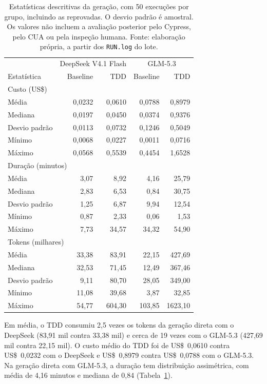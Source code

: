 \documentclass[a4paper,12pt,twoside,english,brazilian]{book}
\begin{document}
\begin{table}[htp]
  \centering
  \caption{Estatísticas descritivas da geração, com 50 execuções por grupo,
    incluindo as reprovadas. O desvio padrão é amostral. Os valores não incluem
    a avaliação posterior pelo Cypress, pelo CUA ou pela inspeção humana.
    Fonte: elaboração própria, a partir dos \texttt{RUN.log} do lote.}
  \label{tab:formulario-recursos}
  \begin{tabular}{lrrrr}
    \hline
    & \multicolumn{2}{c}{DeepSeek V4.1 Flash} & \multicolumn{2}{c}{GLM-5.3} \\
    Estatística & Baseline & TDD & Baseline & TDD \\
    \hline
    \multicolumn{5}{l}{Custo (US\$)} \\
    Média & 0,0232 & 0,0610 & 0,0788 & 0,8979 \\
    Mediana & 0,0197 & 0,0450 & 0,0374 & 0,9376 \\
    Desvio padrão & 0,0113 & 0,0732 & 0,1246 & 0,5049 \\
    Mínimo & 0,0068 & 0,0227 & 0,0011 & 0,0716 \\
    Máximo & 0,0568 & 0,5539 & 0,4454 & 1,6528 \\
    \hline
    \multicolumn{5}{l}{Duração (minutos)} \\
    Média & 3,07 & 8,92 & 4,16 & 25,79 \\
    Mediana & 2,83 & 6,53 & 0,84 & 30,75 \\
    Desvio padrão & 1,25 & 6,87 & 9,94 & 12,54 \\
    Mínimo & 0,87 & 2,33 & 0,06 & 1,53 \\
    Máximo & 7,73 & 34,57 & 34,32 & 54,90 \\
    \hline
    \multicolumn{5}{l}{Tokens (milhares)} \\
    Média & 33,38 & 83,91 & 22,15 & 427,69 \\
    Mediana & 32,53 & 71,45 & 12,49 & 367,46 \\
    Desvio padrão & 9,11 & 80,70 & 28,05 & 349,00 \\
    Mínimo & 11,08 & 39,68 & 3,87 & 32,85 \\
    Máximo & 54,77 & 604,30 & 103,85 & 1623,10 \\
    \hline
  \end{tabular}
\end{table}

Em média, o TDD consumiu 2{,}5 vezes os tokens da geração direta com o
DeepSeek (83{,}91 mil contra 33{,}38 mil) e cerca de 19 vezes com o GLM-5.3
(427{,}69 mil contra 22{,}15 mil). O custo médio do TDD foi de US\$~0,0610
contra US\$~0,0232 com o DeepSeek e US\$~0,8979 contra US\$~0,0788 com o GLM-5.3. Na geração direta com GLM-5.3, a duração tem
distribuição assimétrica, com média de 4{,}16 minutos e mediana de 0{,}84
(Tabela~\ref{tab:formulario-recursos}).
\end{document}
